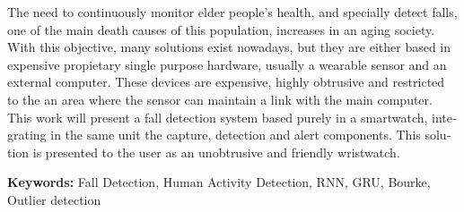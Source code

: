 %
\begin{otherlanguage}{english}
The need to continuously monitor elder people's health, and specially detect falls, one of the main death causes of this population, increases in an aging society. With this objective, many solutions exist nowadays, but they are either based in expensive propietary single purpose hardware, usually a wearable sensor and an external computer. These devices are expensive, highly obtrusive and restricted to the an area where the sensor can maintain a link with the main computer. This work will present a fall detection system based purely in a smartwatch, integrating in the same unit the capture, detection and alert components. This solution is presented to the user as an unobtrusive and friendly wristwatch.

{\bf Keywords:} Fall Detection, Human Activity Detection, RNN, GRU, Bourke, Outlier detection
\end{otherlanguage}
%
